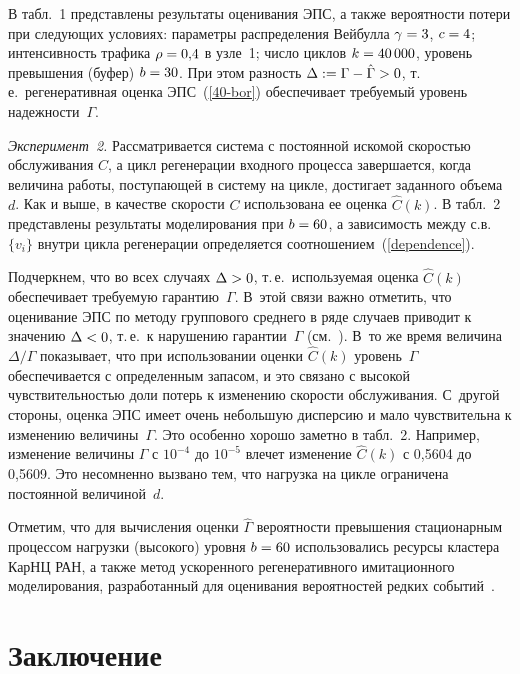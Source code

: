 \begin{multicols}{2}
 В табл.~1 представлены результаты оценивания
ЭПС, а также вероятности потери  при следующих условиях: параметры
распределения Вейбулла $\gamma \hm= 3$, $c\hm=4$; интенсивность трафика
$\rho\hm=0{,}4$ в узле~1; число циклов  $k\hm=40\,000$, уровень превышения
(буфер) $b\hm=30$. При этом разность  $\Delta: = \Gamma \hm-
\hat\Gamma\hm>0$, т.\,е.\ регенеративная оценка ЭПС~(\ref{40-bor})
обеспечивает требуемый  уровень надежности~$\Gamma$.


{\it Эксперимент~2.} Рассматривается  система с постоянной искомой
скоростью обслуживания $C$, а   цикл регенерации входного процесса
завершается, когда   величина работы, поступающей в систему на
цикле, достигает заданного объема~$d$. Как и выше,  в качестве
скорости $C$ использована ее оценка $\hat{C}(k)$. В табл.~2
представлены результаты моделирования при  $b\hm=60$, а зависимость
между с.в.\ $\{v_i\}$ внутри цик\-ла регенерации определяется
соотношением~(\ref{dependence}).




 Подчеркнем, что во всех
случаях $\Delta \hm> 0$, т.\,е.\ используемая оценка $\hat{C}(k)$
обеспечивает требуемую гарантию~$\Gamma$.
 В~этой связи важно отметить, что оценивание ЭПС по методу
группового среднего 
в ряде случаев приводит к значению  $\Delta \hm< 0$, т.\,е.\  к нарушению
гарантии~$\Gamma$ (см.~\cite{KRC}). В~то же время величина
$\Delta/\Gamma$ показывает, что при использовании оценки
$\hat{C}(k)$ уровень~$\Gamma$ обеспечивается с определенным запасом,
и это  связано с высокой чувствительностью доли потерь к изменению
скорости обслуживания. С~другой стороны, оценка ЭПС имеет очень
небольшую дисперсию и мало  чувствительна к изменению величины~$\Gamma$.  
Это особенно  хорошо заметно в табл.~2.
Например, изменение величины $\Gamma$ с  $10^{-4}$ до $10^{-5}$
влечет изменение $\hat{C}(k)$ с 0,5604 до 0,5609. Это несомненно
вызвано  тем, что  нагрузка на цикле ограничена постоянной величиной~$d$.

Отметим, что для вычисления оценки $\hat\Gamma$ вероятности
превышения стационарным процессом нагрузки (высокого) уровня $b\hm=60$
использовались ресурсы кластера КарНЦ РАН, а также метод ускоренного
регенеративного имитационного моделирования, разработанный  для
оценивания вероятностей редких событий~\cite{PPM09}.

\vspace*{-4pt}

\section{Заключение}


\end{multicols}
